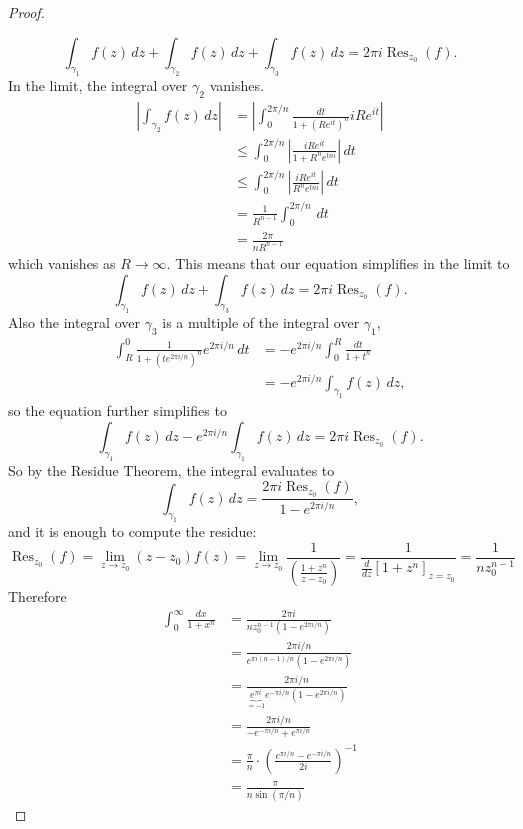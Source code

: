 \documentclass{article}
\begin{document}
\begin{proof}
\begin{multicols}{2}
  \end{multicols}
  \[
    \int_{\gamma_1} f(z)\,dz +
    \int_{\gamma_2} f(z)\,dz +
    \int_{\gamma_3} f(z)\,dz =
    2\pi i \operatorname{Res}_{z_0}(f).
  \]
  In the limit, the integral over $\gamma_2$ vanishes.
  \begin{align*}
    \left|\int_{\gamma_2}f(z)\,dz\right|
    &= \left|
      \int_0^{2\pi/n}\frac{dt}{1 + {(Re^{it})^n}}iRe^{it}
    \right|\\
    &\leq \int_0^{2\pi/n}\left|
      \frac{iRe^{it}}{1 + R^ne^{tni}}
    \right|\, dt \\
    &\leq \int_0^{2\pi/n}\left|
      \frac{iRe^{it}}{R^ne^{tni}}
    \right|\, dt \\
    &= \frac{1}{R^{n - 1}}\int_0^{2\pi/n}\,dt \\
    &= \frac{2\pi}{nR^{n - 1}}
  \end{align*} which vanishes as $R \rightarrow \infty$.
  This means that our equation simplifies in the limit to \[
    \int_{\gamma_1} f(z)\,dz +
    \int_{\gamma_3} f(z)\,dz =
    2\pi i \operatorname{Res}_{z_0}(f).
  \]
  Also the integral over $\gamma_3$ is a multiple of the integral over
  $\gamma_1$,
  \begin{align*}
    \int_R^0\frac{1}{1 + (te^{2\pi i/n})^n}e^{2\pi i/n}\,dt &=
    -e^{2\pi i/n}\int_0^R\frac{dt}{1 + t^n}\\
    &= -e^{2\pi i/n}\int_{\gamma_1} f(z)\,dz,
  \end{align*}
  so the equation further simplifies to \[
  \int_{\gamma_1} f(z)\,dz -
  e^{2\pi i/n} \int_{\gamma_1} f(z)\,dz =
  2\pi i \operatorname{Res}_{z_0}(f).
  \]
  So by the Residue Theorem, the integral evaluates to \[
    \int_{\gamma_1} f(z)\,dz = \frac{2\pi i \operatorname{Res}_{z_0}(f)}{1 - e^{2\pi i/n}},
  \] and it is enough to compute the residue: \[
    \operatorname{Res}_{z_0}(f)
    = \lim_{z \rightarrow z_0} (z - z_0) f(z)
    = \lim_{z \rightarrow z_0} \frac{1}{\displaystyle\left(
      \frac{1 + z^n}{z - z_0}
    \right)}
    = \frac{1}{\displaystyle\frac{d}{dz}\left[
      1 + z^n
    \right]_{z = z_0}}
    = \frac{1}{n z_0^{n-1}}
  \]
  Therefore \begin{align*}
    \int_0^\infty\frac{dx}{1 + x^n}
    &= \frac{2\pi i}{nz_0^{n-1}(1 - e^{2\pi i/n})} \\
    &= \frac{2\pi i/n}{e^{\pi i(n-1)/n}(1 - e^{2\pi i/n})} \\
    &= \frac{2\pi i/n}{\underbrace{e^{\pi i}}_{=-1} e^{-\pi i/n}(1 - e^{2\pi i/n})} \\
    &= \frac{2\pi i/n}{-e^{-\pi i/n} + e^{\pi i/n}} \\
    &= \frac{\pi}{n}\cdot\displaystyle\left(
      \frac{e^{\pi i/n}-e^{-\pi i/n}}{2i}
    \right)^{-1} \\
    &= \frac{\pi}{n \sin(\pi/n)}
  \end{align*}
\end{proof}
\pagebreak
\end{document}
